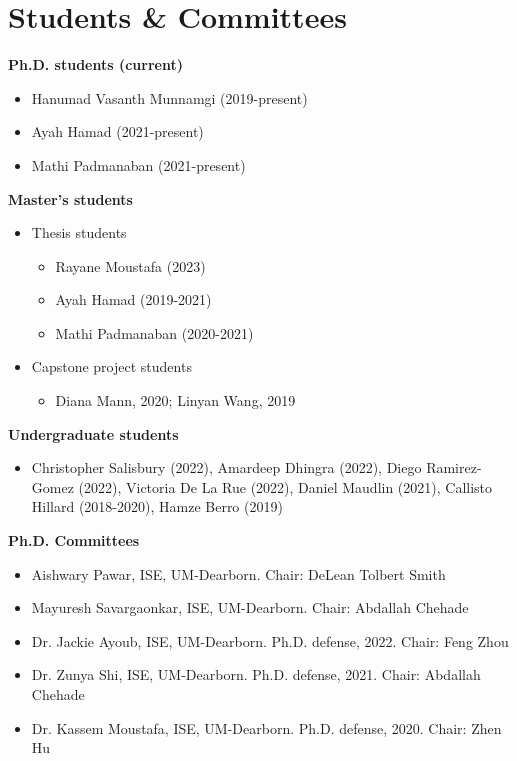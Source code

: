 \documentclass[11pt]{article}
\newenvironment{main}
{\begin{adjustwidth}{3em}{}}
{\end{adjustwidth}}
\begin{document}
\section*{Students \& Committees}
\begin{main}

\textbf{Ph.D. students (current)}
\begin{itemize}
    \item Hanumad Vasanth Munnamgi (2019-present)
    \item Ayah Hamad (2021-present)
    \item Mathi Padmanaban (2021-present)
\end{itemize}

\textbf{Master's students}
\begin{itemize}
    \item Thesis students
        \begin{itemize}
            \item Rayane Moustafa (2023)
            \item Ayah Hamad (2019-2021)
            \item Mathi Padmanaban (2020-2021)
        \end{itemize}
    \item Capstone project students
        \begin{itemize}
            \item Diana Mann, 2020; Linyan Wang, 2019
        \end{itemize}
\end{itemize}

\textbf{Undergraduate students}
\begin{itemize}
    \item 
    Christopher Salisbury (2022), 
    Amardeep Dhingra (2022), 
    Diego Ramirez-Gomez (2022),
    Victoria De La Rue (2022),
    Daniel Maudlin (2021), 
    Callisto Hillard (2018-2020), 
    Hamze Berro (2019)
\end{itemize}

\textbf{Ph.D. Committees}
\begin{itemize}
    \item Aishwary Pawar, ISE, UM-Dearborn. Chair: DeLean Tolbert Smith    
    \item Mayuresh Savargaonkar, ISE, UM-Dearborn. Chair: Abdallah Chehade
    \item Dr. Jackie Ayoub, ISE, UM-Dearborn. Ph.D. defense, 2022. Chair: Feng Zhou
    \item Dr. Zunya Shi, ISE, UM-Dearborn. Ph.D. defense, 2021. Chair: Abdallah Chehade
    \item Dr. Kassem Moustafa, ISE, UM-Dearborn. Ph.D. defense, 2020. Chair: Zhen Hu
\end{itemize}


\end{main}
\end{document}
